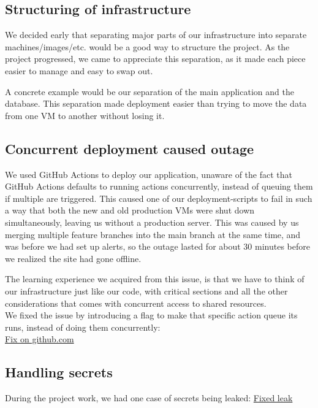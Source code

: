\subsection{Structuring of infrastructure}
We decided early that separating major parts of our infrastructure into separate machines/images/etc. would be a good way to structure the project. As the project progressed, we came to appreciate this separation, as it made each piece easier to manage and easy to swap out.

A concrete example would be our separation of the main application and the database. This separation made deployment easier than trying to move the data from one VM to another without losing it.

\subsection{Concurrent deployment caused outage}
We used GitHub Actions to deploy our application, unaware of the fact that GitHub Actions defaults to running actions concurrently, instead of queuing them if multiple are triggered. This caused one of our deployment-scripts to fail in such a way that both the new and old production VMs were shut down simultaneously, leaving us without a production server. This was caused by us merging multiple feature branches into the main branch at the same time, and was before we had set up alerts, so the outage lasted for about 30 minutes before we realized the site had gone offline.

The learning experience we acquired from this issue, is that we have to think of our infrastructure just like our code, with critical sections and all the other considerations that comes with concurrent access to shared resources.\\

We fixed the issue by introducing a flag to make that specific action queue its runs, instead of doing them concurrently:\\
\href{https://github.com/ChadIImus/Devoops/commit/d84b7f3386f1c9106bc173767507488977856268}{Fix on github.com}


\subsection{Handling secrets}

During the project work, we had one case of secrets being leaked:
\href{https://github.com/ChadIImus/Devoops/commit/8f034df248d53f19b084fa88ce6c546c87714843}{Fixed leak}

